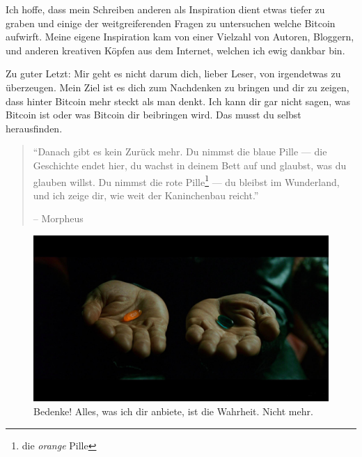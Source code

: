 Ich hoffe, dass mein Schreiben anderen als Inspiration dient etwas tiefer
zu graben und einige der weitgreiferenden Fragen zu untersuchen welche Bitcoin
aufwirft. Meine eigene Inspiration kam von einer Vielzahl von Autoren, Bloggern,
und anderen kreativen Köpfen aus dem Internet, welchen ich ewig dankbar bin.

Zu guter Letzt: Mir geht es nicht darum dich, lieber Leser, von irgendetwas zu
überzeugen. Mein Ziel ist es dich zum Nachdenken zu bringen und dir zu zeigen,
dass hinter Bitcoin mehr steckt als man denkt. Ich kann dir gar nicht sagen,
was Bitcoin ist oder was Bitcoin dir beibringen wird. Das musst du selbst
herausfinden.

\begin{quotation}\begin{samepage}
\enquote{Danach gibt es kein Zurück mehr. Du nimmst die blaue Pille --- die
Geschichte endet hier, du wachst in deinem Bett auf und glaubst, was du glauben
willst. Du nimmst die rote Pille\footnote{die \textit{orange} Pille} --- du
bleibst im Wunderland, und ich zeige dir, wie weit der Kaninchenbau reicht.}
\begin{flushright} -- Morpheus
\end{flushright}\end{samepage}\end{quotation}

\begin{figure}
  \includegraphics{assets/images/bitcoin-orange-pill.jpg}
  \caption*{Bedenke! Alles, was ich dir anbiete, ist die Wahrheit. Nicht mehr.}
  \label{fig:bitcoin-orange-pill}
\end{figure}

%
%
%
